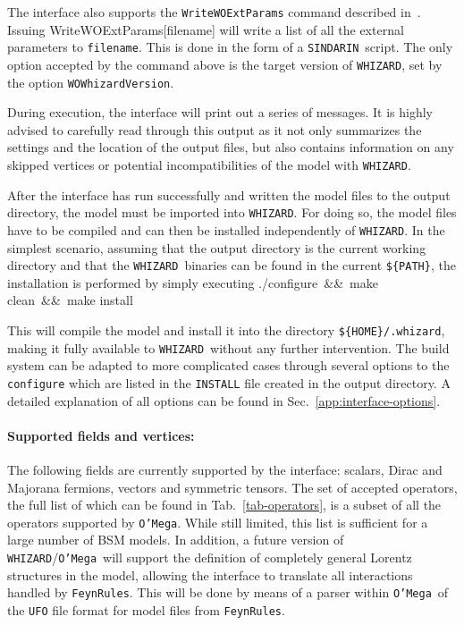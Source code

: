 \documentclass[12pt]{book}
\newenvironment{code}%
  {\begingroup\footnotesize
   \quote
   \Verbatim}%
  {\endVerbatim
   \endquote
   \endgroup\noindent}
\newcommand{\ttt}[1]{\texttt{#1}}
\newcommand{\whizard}{\ttt{WHIZARD}}
\newcommand{\oMega}{\ttt{O'Mega}}
\newcommand{\FeynRules}{\ttt{FeynRules}}
\newcommand{\sindarin}{\ttt{SINDARIN}}
\begin{document}
The interface also supports the \ttt{WriteWOExtParams} command
described in~\cite{Christensen:2008py}. Issuing
\begin{code}
  WriteWOExtParams[filename]
\end{code}
will write a list of all the external parameters to
\ttt{filename}. This is done in the form of a \sindarin\
script. The only option accepted by the command above is the target
version of \whizard, set by the option \ttt{WOWhizardVersion}.

During execution, the interface will print out a series of
messages. It is highly advised to carefully read through this output
as it not only summarizes the settings and the location of the output
files, but also contains information on any skipped vertices or
potential incompatibilities of the model with \whizard.

After the interface has run successfully and written the model files to the
output directory, the model must be imported into \whizard. For doing
so, the model files have to be compiled and can then be installed
independently of \whizard. In the simplest scenario, assuming that the
output directory is the current working directory and that the
\whizard\ binaries can be found in the current \ttt{\$\{PATH\}},
the installation is performed by simply executing
\begin{code}
./configure~\&\&~make clean~\&\&~make install
\end{code}

This will compile the model and install it into the directory
\ttt{\$\{HOME\}/.whizard}, making it fully available to \whizard\
without any further intervention. The build system can be adapted to
more complicated cases through several options to the
\ttt{configure} which are listed in the \ttt{INSTALL} file
created in the output directory. A detailed explanation of all options
can be found in Sec.~\ref{app:interface-options}.

\paragraph{\bf Supported fields and vertices:}

The following fields are currently supported by the interface:
scalars, Dirac and Majorana fermions, vectors and symmetric tensors.
The set of accepted operators, the full list of which can be found in
Tab.~\ref{tab-operators}, is a subset of all the operators supported
by \oMega. While still limited, this list is sufficient for a large
number of BSM models. In addition, a future version of
\whizard/\oMega\ will support the definition of completely general
Lorentz structures in the model, allowing the interface to
translate all interactions handled by \FeynRules. This will be done by
means of a parser within \oMega\ of the \ttt{UFO} file format for
model files from \FeynRules.
\end{document}
